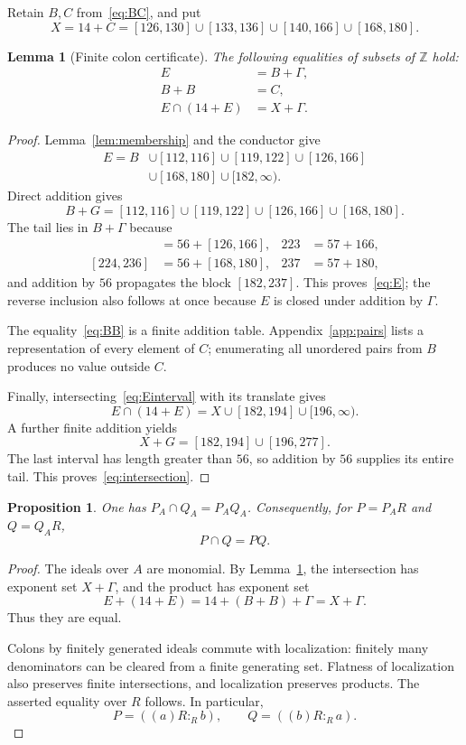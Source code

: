 \documentclass[11pt,letterpaper]{article}
\newtheorem{proposition}[theorem]{Proposition}
\newtheorem{lemma}[theorem]{Lemma}
\theoremstyle{remark}
\newcommand{\ZZ}{\mathbb Z}
\numberwithin{equation}{section}
\begin{document}
Retain $B,C$ from~\eqref{eq:BC}, and put
\[
 X=14+C=[126,130]\cup[133,136]\cup[140,166]\cup[168,180].
\]
\begin{lemma}[Finite colon certificate]\label{lem:certificate}
The following equalities of subsets of $\ZZ$ hold:
\begin{align}
 E&=B+\Gamma,\label{eq:E}\\
 B+B&=C,\label{eq:BB}\\
 E\cap(14+E)&=X+\Gamma.\label{eq:intersection}
\end{align}
\end{lemma}
\begin{proof}
Lemma~\ref{lem:membership} and the conductor give
\begin{equation}\label{eq:Einterval}
\begin{split}
E=B&\cup[112,116]\cup[119,122]\cup[126,166]\\
 &\cup[168,180]\cup[182,\infty).
\end{split}
\end{equation}
Direct addition gives
\[
 B+G=[112,116]\cup[119,122]\cup[126,166]\cup[168,180].
\]
The tail lies in $B+\Gamma$ because
\begin{align*}
 [182,222]&=56+[126,166],&223&=57+166,\\
 [224,236]&=56+[168,180],&237&=57+180,
\end{align*}
and addition by $56$ propagates the block $[182,237]$. This proves~\eqref{eq:E}; the reverse inclusion also follows at once because $E$ is closed under addition by $\Gamma$.

The equality~\eqref{eq:BB} is a finite addition table. Appendix~\ref{app:pairs} lists a representation of every element of $C$; enumerating all unordered pairs from $B$ produces no value outside $C$.

Finally, intersecting~\eqref{eq:Einterval} with its translate gives
\[
 E\cap(14+E)=X\cup[182,194]\cup[196,\infty).
\]
A further finite addition yields
\[
 X+G=[182,194]\cup[196,277].
\]
The last interval has length greater than $56$, so addition by $56$ supplies its entire tail. This proves~\eqref{eq:intersection}.
\end{proof}

\begin{proposition}\label{prop:colonidentity}
One has $P_A\cap Q_A=P_AQ_A$. Consequently, for $P=P_AR$ and $Q=Q_AR$,
\begin{equation}\label{eq:colonidentity}
 P\cap Q=PQ.
\end{equation}
\end{proposition}
\begin{proof}
The ideals over $A$ are monomial. By Lemma~\ref{lem:certificate}, the intersection has exponent set $X+\Gamma$, and the product has exponent set
\[
 E+(14+E)=14+(B+B)+\Gamma=X+\Gamma.
\]
Thus they are equal.

Colons by finitely generated ideals commute with localization: finitely many denominators can be cleared from a finite generating set. Flatness of localization also preserves finite intersections, and localization preserves products. The asserted equality over $R$ follows. In particular,
\[
 P=((a)R:_R b),\qquad Q=((b)R:_R a).
\]
\end{proof}
\end{document}
